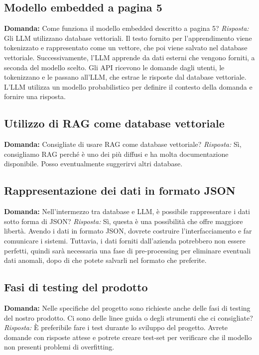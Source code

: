 \documentclass{article}
\begin{document}
\subsection{Modello embedded a pagina 5}
\textbf{Domanda:} Come funziona il modello embedded descritto a pagina 5? \newline
\textit{Risposta:} Gli LLM utilizzano database vettoriali. Il testo fornito per l'apprendimento viene tokenizzato e rappresentato come un vettore, che poi viene salvato nel database vettoriale. Successivamente, l'LLM apprende da dati esterni che vengono forniti, a seconda del modello scelto. Gli API ricevono le domande dagli utenti, le tokenizzano e le passano all'LLM, che estrae le risposte dal database vettoriale. L'LLM utilizza un modello probabilistico per definire il contesto della domanda e fornire una risposta.

\subsection{Utilizzo di RAG come database vettoriale}
\textbf{Domanda:} Consigliate di usare RAG come database vettoriale? \newline
\textit{Risposta:} Sì, consigliamo RAG perché è uno dei più diffusi e ha molta documentazione disponibile. Posso eventualmente suggerirvi altri database.

\subsection{Rappresentazione dei dati in formato JSON}
\textbf{Domanda:} Nell'intermezzo tra database e LLM, è possibile rappresentare i dati sotto forma di JSON? \newline
\textit{Risposta:} Sì, questa è una possibilità che offre maggiore libertà. Avendo i dati in formato JSON, dovrete costruire l'interfacciamento e far comunicare i sistemi. Tuttavia, i dati forniti dall'azienda potrebbero non essere perfetti, quindi sarà necessaria una fase di pre-processing per eliminare eventuali dati anomali, dopo di che potete salvarli nel formato che preferite.

\subsection{Fasi di testing del prodotto}
\textbf{Domanda:} Nelle specifiche del progetto sono richieste anche delle fasi di testing del nostro prodotto. Ci sono delle linee guida o degli strumenti che ci consigliate? \newline
\textit{Risposta:} È preferibile fare i test durante lo sviluppo del progetto. Avrete domande con risposte attese e potrete creare test-set per verificare che il modello non presenti problemi di overfitting.
\end{document}
